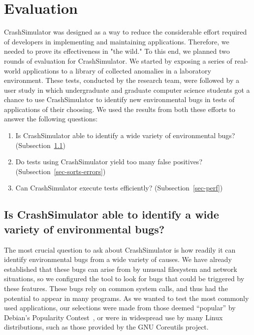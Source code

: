 \section{Evaluation}
\label{SEC:evaluation}

CrashSimulator was designed
as a way to reduce the considerable effort
required of developers 
in implementing and maintaining applications.
Therefore,
we needed to prove its effectiveness in "the wild."
To this end,
we planned two rounds of
evaluation for CrashSimulator.
We started by exposing
a series of real-world applications
to a library of collected anomalies in a laboratory environment.
These tests,
conducted by the research team,
were followed by a user study
in which undergraduate and graduate computer science students
got a chance to use CrashSimulator
to identify new environmental bugs
in tests of applications of their choosing.
We used the results from both these efforts
to answer the following questions:

\begin{enumerate}

\item{Is CrashSimulator able to identify a wide variety of environmental
    bugs?
(Subsection~\ref{sec-env-bugs})}

\item{Do tests using CrashSimulator yield too many false positives?
      (Subsection~\ref{sec-sorts-errors})}

\item{Can CrashSimulator
      execute tests efficiently? (Subsection~\ref{sec-perf})}

\end{enumerate}

\subsection{Is CrashSimulator able to identify a wide variety of
environmental bugs?}
\label{sec-env-bugs}

The most crucial question to ask about CrashSimulator
is how readily it can
identify environmental bugs
from a wide variety of causes.
We have already established
that these bugs can arise from
by unusual filesystem and network situations,
so we configured the tool to look
for bugs that could be triggered by these features.
These bugs rely on common system calls,
and thus had the potential to
appear in many programs.
As we wanted to test
the most commonly used applications,
our selections were made
from those deemed ``popular''
by Debian's Popularity Contest~\cite{DebPopCon},
or were in widespread use
by many Linux distributions,
such as those provided
by the GNU Coreutils project.

